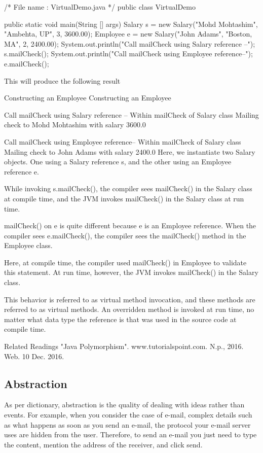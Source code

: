 /* File name : VirtualDemo.java */
public class VirtualDemo {

   public static void main(String [] args) {
      Salary s = new Salary("Mohd Mohtashim", "Ambehta, UP", 3, 3600.00);
      Employee e = new Salary("John Adams", "Boston, MA", 2, 2400.00);
      System.out.println("Call mailCheck using Salary reference --");
      s.mailCheck();
      System.out.println("\n Call mailCheck using Employee reference--");
      e.mailCheck();
   }
}
This will produce the following result

Constructing an Employee
Constructing an Employee

Call mailCheck using Salary reference --
Within mailCheck of Salary class
Mailing check to Mohd Mohtashim with salary 3600.0

Call mailCheck using Employee reference--
Within mailCheck of Salary class
Mailing check to John Adams with salary 2400.0
Here, we instantiate two Salary objects. One using a Salary reference s, and the other using an Employee reference e.

While invoking s.mailCheck(), the compiler sees mailCheck() in the Salary class at compile time, and the JVM invokes mailCheck() in the Salary class at run time.

mailCheck() on e is quite different because e is an Employee reference. When the compiler sees e.mailCheck(), the compiler sees the mailCheck() method in the Employee class.

Here, at compile time, the compiler used mailCheck() in Employee to validate this statement. At run time, however, the JVM invokes mailCheck() in the Salary class.

This behavior is referred to as virtual method invocation, and these methods are referred to as virtual methods. An overridden method is invoked at run time, no matter what data type the reference is that was used in the source code at compile time.

Related Readings
"Java Polymorphism". www.tutorialspoint.com. N.p., 2016. Web. 10 Dec. 2016.

\subsection{Abstraction}

As per dictionary, abstraction is the quality of dealing with ideas rather than events. For example, when you consider the case of e-mail, complex details such as what happens as soon as you send an e-mail, the protocol your e-mail server uses are hidden from the user. Therefore, to send an e-mail you just need to type the content, mention the address of the receiver, and click send.

